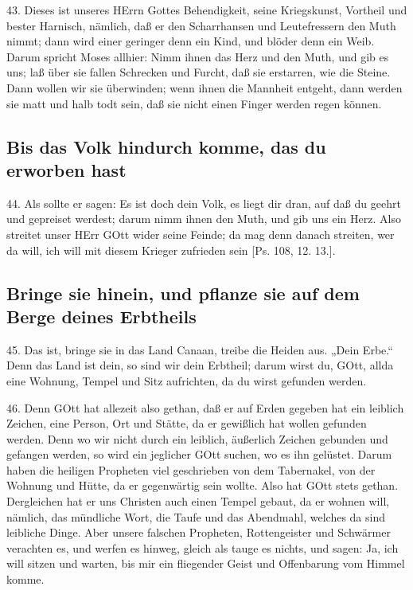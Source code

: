 43. Dieses ist unseres HErrn Gottes Behendigkeit, seine Kriegskunst, Vortheil und bester Harnisch, nämlich, daß er den Scharrhansen und Leutefressern den Muth nimmt; dann wird einer geringer denn ein Kind, und blöder denn ein Weib. Darum spricht Moses allhier: Nimm ihnen das Herz und den Muth, und gib es uns; laß über sie fallen Schrecken und Furcht, daß
sie erstarren, wie die Steine. Dann wollen wir sie überwinden; wenn ihnen die Mannheit entgeht, dann werden sie matt und halb todt sein, daß sie nicht einen Finger werden regen können.

\subsection{Bis das Volk hindurch komme, das du erworben hast}

44. Als sollte er sagen: Es ist doch dein Volk, es liegt dir dran, auf daß du geehrt und gepreiset werdest; darum nimm ihnen den Muth, und gib uns ein Herz. Also streitet unser HErr GOtt wider seine Feinde; da mag denn danach streiten, wer da will, ich will mit diesem Krieger zufrieden sein [Ps. 108, 12. 13.].

\subsection{Bringe sie hinein, und pflanze sie auf dem Berge deines Erbtheils}

45. Das ist, bringe sie in das Land Canaan, treibe die Heiden aus. „Dein Erbe.“ Denn das Land ist dein, so sind wir dein Erbtheil; darum wirst du, GOtt, allda eine Wohnung, Tempel und Sitz aufrichten, da du wirst gefunden werden.

46. Denn GOtt hat allezeit also gethan, daß er auf Erden gegeben hat ein leiblich Zeichen, eine Person, Ort und Stätte, da er gewißlich hat wollen gefunden werden. Denn wo wir nicht durch ein leiblich, äußerlich Zeichen gebunden und gefangen werden, so wird ein jeglicher GOtt suchen, wo es ihn gelüstet. Darum haben die heiligen Propheten viel geschrieben von dem Tabernakel, von der Wohnung und Hütte, da er gegenwärtig sein wollte. Also hat GOtt stets gethan. Dergleichen hat er uns Christen auch einen Tempel gebaut, da er wohnen will, nämlich, das mündliche Wort, die Taufe und das Abendmahl, welches da sind leibliche Dinge. Aber unsere falschen Propheten, Rottengeister und Schwärmer verachten es, und werfen es hinweg, gleich als tauge es nichts, und sagen: Ja, ich will sitzen und warten, bis mir ein fliegender Geist und Offenbarung vom Himmel komme.


